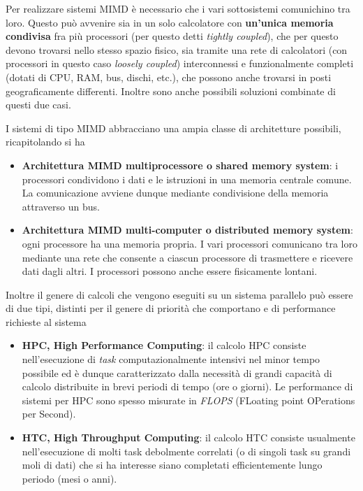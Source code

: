 \documentclass[italian,]{article}
\providecommand{\tightlist}{%
  \setlength{\itemsep}{0pt}\setlength{\parskip}{0pt}}
\begin{document}
Per realizzare sistemi MIMD è necessario che i vari sottosistemi
comunichino tra loro. Questo può avvenire sia in un solo calcolatore con
\textbf{un'unica memoria condivisa} fra più processori (per questo detti
\emph{tightly coupled}), che per questo devono trovarsi nello stesso
spazio fisico, sia tramite una rete di calcolatori (con processori in
questo caso \emph{loosely coupled}) interconnessi e funzionalmente
completi (dotati di CPU, RAM, bus, dischi, etc.), che possono anche
trovarsi in posti geograficamente differenti. Inoltre sono anche
possibili soluzioni combinate di questi due casi.

I sistemi di tipo MIMD abbracciano una ampia classe di architetture
possibili, ricapitolando si ha

\begin{itemize}
\tightlist
\item
  \textbf{Architettura MIMD multiprocessore o shared memory system}: i
  processori condividono i dati e le istruzioni in una memoria centrale
  comune. La comunicazione avviene dunque mediante condivisione della
  memoria attraverso un bus.
\item
  \textbf{Architettura MIMD multi-computer o distributed memory system}:
  ogni processore ha una memoria propria. I vari processori comunicano
  tra loro mediante una rete che consente a ciascun processore di
  trasmettere e ricevere dati dagli altri. I processori possono anche
  essere fisicamente lontani.
\end{itemize}

Inoltre il genere di calcoli che vengono eseguiti su un sistema
parallelo può essere di due tipi, distinti per il genere di priorità che
comportano e di performance richieste al sistema

\begin{itemize}
\tightlist
\item
  \textbf{HPC, High Performance Computing}: il calcolo HPC consiste
  nell'esecuzione di \emph{task} computazionalmente intensivi nel minor
  tempo possibile ed è dunque caratterizzato dalla necessità di grandi
  capacità di calcolo distribuite in brevi periodi di tempo (ore o
  giorni). Le performance di sistemi per HPC sono spesso misurate in
  \emph{FLOPS} (FLoating point OPerations per Second).
\item
  \textbf{HTC, High Throughput Computing}: il calcolo HTC consiste
  usualmente nell'esecuzione di molti task debolmente correlati (o di
  singoli task su grandi moli di dati) che si ha interesse siano
  completati efficientemente lungo periodo (mesi o anni).
\end{itemize}
\end{document}
